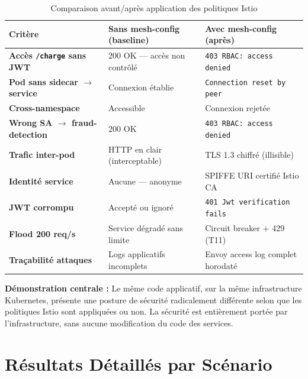 \begin{table}[H]
  \centering
  \caption{Comparaison avant/après application des politiques Istio}
  \label{tab:avant_apres}
  \renewcommand{\arraystretch}{2}
  \begin{tabularx}{\textwidth}{
    >{\bfseries}L{3.8cm} L{3.5cm} X
  }
    \toprule
    Critère & Sans mesh-config (baseline) & Avec mesh-config (après) \\
    \midrule
    Accès \texttt{/charge} sans JWT
      & 200 OK --- accès non contrôlé
      & \texttt{403 RBAC: access denied} \\
    Pod sans sidecar $\rightarrow$ service
      & Connexion établie
      & \texttt{Connection reset by peer} \\
    Cross-namespace
      & Accessible
      & Connexion rejetée \\
    Wrong SA $\rightarrow$ fraud-detection
      & 200 OK
      & \texttt{403 RBAC: access denied} \\
    Trafic inter-pod
      & HTTP en clair (interceptable)
      & TLS 1.3 chiffré (illisible) \\
    Identité service
      & Aucune --- anonyme
      & SPIFFE URI certifié Istio CA \\
    JWT corrompu
      & Accepté ou ignoré
      & \texttt{401 Jwt verification fails} \\
    Flood 200 req/s
      & Service dégradé sans limite
      & Circuit breaker + 429 (T11) \\
    Traçabilité attaques
      & Logs applicatifs incomplets
      & Envoy access log complet horodaté \\
    \bottomrule
  \end{tabularx}
\end{table}

\textbf{Démonstration centrale :} Le même code applicatif, sur la même
infrastructure Kubernetes, présente une posture de sécurité radicalement
différente selon que les politiques Istio sont appliquées ou non. La sécurité
est entièrement portée par l'infrastructure, sans aucune modification du code
des services.

\vspace{3.5cm}
\section{Résultats Détaillés par Scénario}

